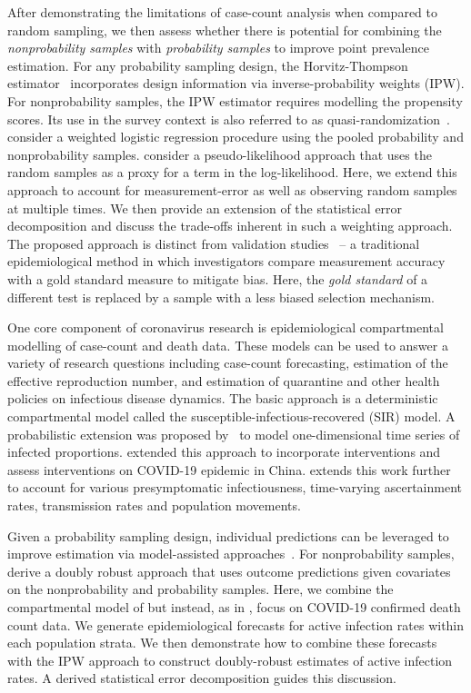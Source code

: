 \documentclass[11pt]{amsart}
\numberwithin{equation}{section}
\theoremstyle{plain}
\begin{document}
After demonstrating the limitations of case-count analysis when compared to random sampling, we then assess whether there is potential for combining the \emph{nonprobability samples} with \emph{probability samples} to improve point prevalence estimation. For any probability sampling design, the Horvitz-Thompson estimator~\citep{HT1952} incorporates design information via inverse-probability weights (IPW).  For nonprobability samples, the IPW estimator requires modelling the propensity scores.  Its use in the survey context is also referred to as quasi-randomization~\citep{Elliott2017}. \cite{Valliant2011} consider a weighted logistic regression procedure using the pooled probability and nonprobability samples.  \cite{Chen2019} consider a pseudo-likelihood approach that uses the random samples as a proxy for a term in the log-likelihood.  Here, we extend this approach to account for measurement-error as well as observing random samples at multiple times. We then provide an extension of the statistical error decomposition and discuss the trade-offs inherent in such a weighting approach. The proposed approach is distinct from validation studies~\citep{Fox2020} -- a traditional epidemiological method in which investigators compare measurement accuracy with a gold standard measure to mitigate bias.  Here, the \emph{gold standard} of a different test is replaced by a sample with a less biased selection mechanism.

One core component of coronavirus research is epidemiological compartmental modelling of case-count and death data. These models can be used to answer a variety of research questions including case-count forecasting, estimation of the effective reproduction number, and estimation of quarantine and other health policies on infectious disease dynamics.  The basic approach is a deterministic compartmental model called the susceptible-infectious-recovered (SIR) model.  A probabilistic extension was proposed by~\cite{Osthus2017} to model one-dimensional time series of infected proportions. \cite{Song2020} extended this approach to incorporate interventions and assess interventions on COVID-19 epidemic in China. \cite{Hao2020} extends this work further to account for various presymptomatic infectiousness, time-varying ascertainment rates, transmission rates and population movements.

Given a probability sampling design, individual predictions can be leveraged to improve estimation via model-assisted approaches~\citep{Breidt2017}.  For nonprobability samples, \cite{Chen2019} derive a doubly robust approach that uses outcome predictions given covariates on the nonprobability and probability samples.  Here, we combine the compartmental model of \cite{Song2020} but instead, as in \cite{Johndrow2020}, focus on COVID-19 confirmed death count data.  We generate epidemiological forecasts for active infection rates within each population strata.  We then demonstrate how to combine these forecasts with the IPW approach to construct doubly-robust estimates of active infection rates.  A derived statistical error decomposition guides this discussion.
\end{document}
